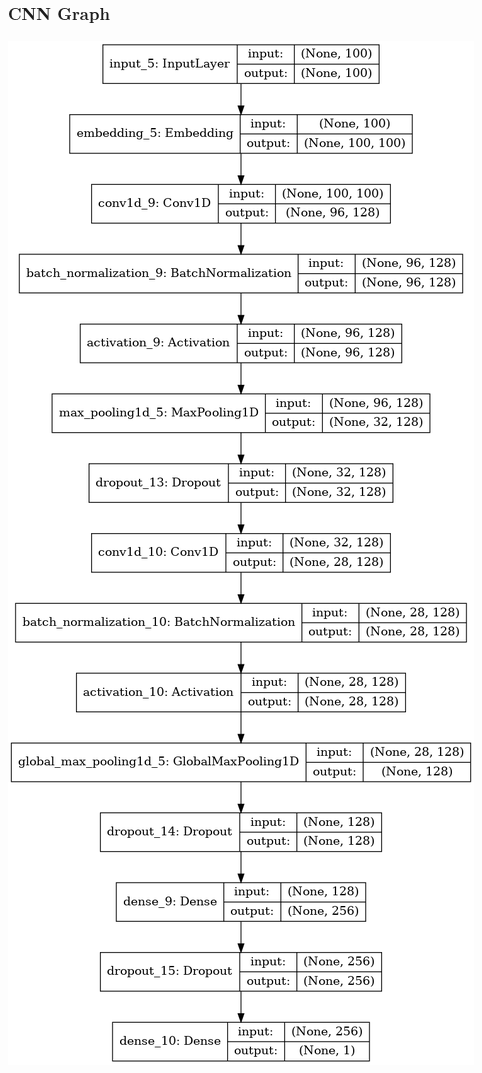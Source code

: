 \documentclass{beamer}
\begin{document}
\begin{frame}
    \frametitle{CNN Graph}
    \includegraphics[scale=0.15]{cnn_model.png}
\end{frame}
\end{document}
